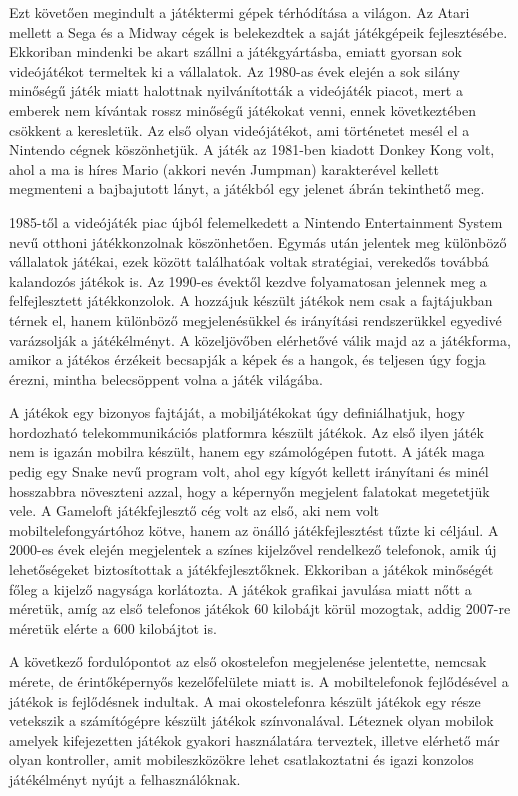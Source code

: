 
Ezt követően megindult a játéktermi gépek térhódítása a világon. 
Az Atari mellett a Sega és a Midway cégek is belekezdtek a saját játékgépeik fejlesztésébe. 
Ekkoriban mindenki be akart szállni a játékgyártásba, emiatt gyorsan sok videójátékot termeltek ki a vállalatok. 
Az 1980-as évek elején a sok silány minőségű játék miatt halottnak nyilvánították a videójáték piacot, mert a emberek nem kívántak rossz minőségű játékokat venni, ennek következtében csökkent a keresletük. 
Az első olyan videójátékot, ami történetet mesél el a Nintendo cégnek köszönhetjük. 
A játék az 1981-ben kiadott Donkey Kong volt, ahol a ma is híres Mario (akkori nevén Jumpman) karakterével kellett megmenteni a bajbajutott lányt, a játékból egy jelenet  ábrán tekinthető meg. 

1985-től a videójáték piac újból felemelkedett a Nintendo Entertainment System nevű otthoni játékkonzolnak köszönhetően. 
Egymás után jelentek meg különböző vállalatok játékai, ezek között találhatóak voltak stratégiai, verekedős továbbá kalandozós játékok is. 
Az 1990-es évektől kezdve folyamatosan jelennek meg a felfejlesztett játékkonzolok. 
A hozzájuk készült játékok nem csak a fajtájukban térnek el, hanem különböző megjelenésükkel és irányítási rendszerükkel egyedivé varázsolják a játékélményt. 
A közeljövőben elérhetővé válik majd az a játékforma, amikor a játékos érzékeit becsapják a képek és a hangok, és teljesen úgy fogja érezni, mintha belecsöppent volna a játék világába. 

A játékok egy bizonyos fajtáját, a mobiljátékokat úgy definiálhatjuk, hogy hordozható telekommunikációs platformra készült játékok. 
Az első ilyen játék nem is igazán mobilra készült, hanem egy számológépen futott. 
A játék maga pedig egy Snake nevű program volt, ahol egy kígyót kellett irányítani és minél hosszabbra növeszteni azzal, hogy a képernyőn megjelent falatokat megetetjük vele. 
A Gameloft játékfejlesztő cég volt az első, aki nem volt mobiltelefongyártóhoz kötve, hanem az önálló játékfejlesztést tűzte ki céljául. 
A 2000-es évek elején megjelentek a színes kijelzővel rendelkező telefonok, amik új lehetőségeket biztosítottak a játékfejlesztőknek. 
Ekkoriban a játékok minőségét főleg a kijelző nagysága korlátozta. 
A játékok grafikai javulása miatt nőtt a méretük, amíg az első telefonos játékok 60 kilobájt körül mozogtak, addig 2007-re méretük elérte a 600 kilobájtot is. 

A következő fordulópontot az első okostelefon megjelenése jelentette, nemcsak mérete, de érintőképernyős kezelőfelülete miatt is. 
A mobiltelefonok fejlődésével a játékok is fejlődésnek indultak. 
A mai okostelefonra készült játékok egy része vetekszik a számítógépre készült játékok színvonalával. 
Léteznek olyan mobilok amelyek kifejezetten játékok gyakori használatára terveztek, illetve elérhető már olyan kontroller, amit mobileszközökre lehet csatlakoztatni és igazi konzolos játékélményt nyújt a felhasználóknak. 

